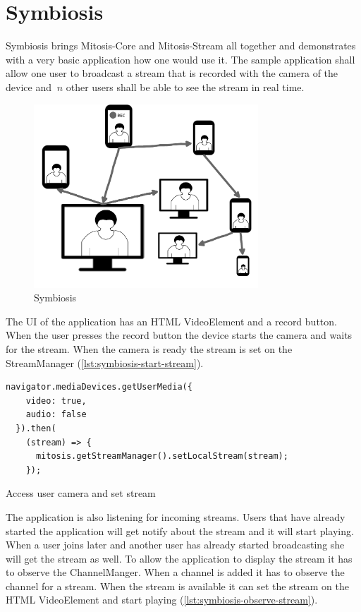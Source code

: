 \section{Symbiosis}
Symbiosis brings Mitosis-Core and Mitosis-Stream all together and demonstrates with a very basic application how one would use it.
The sample application shall allow one user to broadcast a stream that is recorded with the camera of the device and $\ n $ other users shall be able to see the stream in real time.

\begin{figure}
\centering
\includegraphics[width=0.75\textwidth]{graphics/implementation/symbiosis.pdf}
\caption{Symbiosis}
\label{fig:mit-stream}
\end{figure}

The UI of the application has an HTML VideoElement and a record button. When the user presses the record button the device starts the camera and waits for the stream. When the camera is ready the stream is set on the StreamManager (\vref{lst:symbiosis-start-stream}).

\begin{Listing}
\begin{lstlisting}
navigator.mediaDevices.getUserMedia({
    video: true,
    audio: false
  }).then(
    (stream) => {
      mitosis.getStreamManager().setLocalStream(stream);
    });
\end{lstlisting}
\caption{Access user camera and set stream}
\label{lst:symbiosis-start-stream}
\end{Listing}

The application is also listening for incoming streams. Users that have already started the application will get notify about the stream and it will start playing. When a user joins later and another user has already started broadcasting she will get the stream as well.
To allow the application to display the stream it has to observe the ChannelManger. When a channel is added it has to observe the channel for a stream. When the stream is available it can set the stream on the HTML VideoElement and start playing (\vref{lst:symbiosis-observe-stream}).

